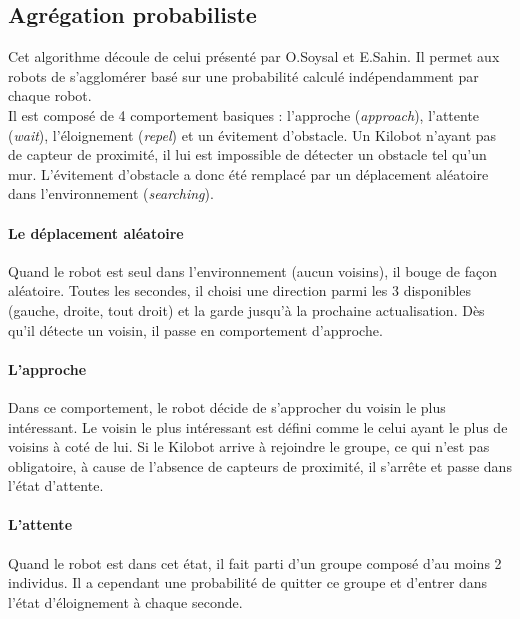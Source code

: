 \documentclass[a4paper]{article}
\begin{document}
\subsection{Agrégation probabiliste}

Cet algorithme découle de celui présenté par O.Soysal et E.Sahin. \cite{soysal_probabilistic_2005} Il permet aux robots de s'agglomérer basé sur une probabilité calculé indépendamment par chaque robot.\\

Il est composé de 4 comportement basiques : l'approche
(\textit{approach}), l'attente
(\textit{wait}), l'éloignement 
(\textit{repel}) et un évitement d'obstacle.
Un Kilobot n'ayant pas de capteur de proximité, il lui est impossible de détecter un obstacle tel qu'un mur. L'évitement d'obstacle a donc été remplacé par un déplacement aléatoire dans l'environnement (\textit{searching}).
\paragraph{Le déplacement aléatoire} Quand le robot est seul dans l'environnement (aucun voisins), il bouge de façon aléatoire. Toutes les secondes, il choisi une direction parmi les 3 disponibles (gauche, droite, tout droit) et la garde jusqu'à la prochaine actualisation. Dès qu'il détecte un voisin, il passe en comportement d'approche.
\paragraph{L'approche}Dans ce comportement, le robot décide de s'approcher du voisin le plus intéressant. Le voisin le plus intéressant est défini comme le celui ayant le plus de voisins à coté de lui. Si le Kilobot arrive à rejoindre le groupe, ce qui n'est pas obligatoire, à cause de l'absence de capteurs de proximité, il s'arrête et passe dans l'état d'attente.
\paragraph{L'attente} Quand le robot est dans cet état, il fait parti d'un groupe composé d'au moins 2 individus. Il a cependant une probabilité de quitter ce groupe et d'entrer dans l'état d'éloignement à chaque seconde.
\end{document}
